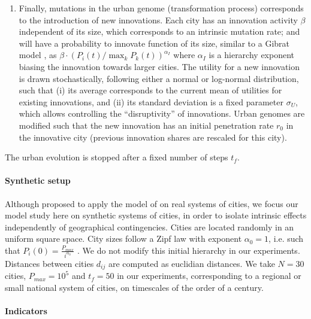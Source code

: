 \documentclass[letterpaper]{article}
\begin{document}
\begin{enumerate}
 \item Finally, mutations in the urban genome (transformation process) corresponds to the introduction of new innovations. Each city has an innovation activity $\beta$ independent of its size, which corresponds to an intrinsic mutation rate; and will have a probability to innovate function of its size, similar to a Gibrat model \citep{pumain2012theorie}, as $\beta \cdot \left(P_i (t) / \max_k P_k (t)\right)^{\alpha_I}$ where $\alpha_I$ is a hierarchy exponent biasing the innovation towards larger cities. The utility for a new innovation is drawn stochastically, following either a normal or log-normal distribution, such that (i) its average corresponds to the current mean of utilities for existing innovations, and (ii) its standard deviation is a fixed parameter $\sigma_U$, which allows controlling the ``disruptivity'' of innovations. Urban genomes are modified such that the new innovation has an initial penetration rate $r_0$ in the innovative city (previous innovation shares are rescaled for this city).
\end{enumerate}

The urban evolution is stopped after a fixed number of steps $t_f$.

\paragraph{Synthetic setup}

Although \cite{raimbault:halshs-01880492} proposed to apply the model of \cite{favaro2011gibrat} on real systems of cities, we focus our model study here on synthetic systems of cities, in order to isolate intrinsic effects independently of geographical contingencies. Cities are located randomly in an uniform square space. City sizes follow a Zipf law with exponent $\alpha_0 = 1$, i.e. such that $P_i (0) = \frac{P_{max}}{i^{\alpha_0}}$ \citep{pumain2012theorie}. We do not modify this initial hierarchy in our experiments. Distances between cities $d_{ij}$ are computed as euclidian distances. We take $N=30$ cities, $P_{max} = 10^5$ and $t_f = 50$ in our experiments, corresponding to a regional or small national system of cities, on timescales of the order of a century.


\paragraph{Indicators}

\end{document}
